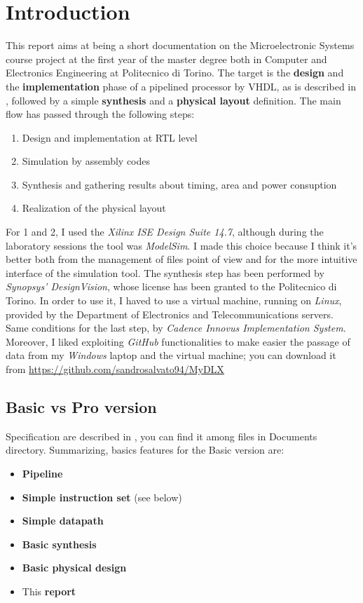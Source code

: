 \chapter{Introduction}

This report aims at being a short documentation on the Microelectronic Systems course project at the first year of the master degree both in Computer and Electronics Engineering at Politecnico di Torino. \newline
The target is the \textbf{design} and the \textbf{implementation} phase of a pipelined processor by VHDL, as is described in \cite{book:rif.1}, followed by a simple \textbf{synthesis} and a \textbf{physical layout} definition. The main flow has passed through the following steps:
\begin{enumerate}
\item Design and implementation at RTL level
\item Simulation by assembly codes
\item Synthesis and gathering results about timing, area and power consuption
\item Realization of the physical layout
\end{enumerate}

For 1 and 2, I used the \textit{Xilinx ISE Design Suite 14.7}, although during the laboratory sessions the tool was \textit{ModelSim}. I made this choice because I think it's better both from the management of files point of view and for the more intuitive interface of the simulation tool. The synthesis step has been performed by \textit{Synopsys' DesignVision}, whose license has been granted to the Politecnico di Torino. In order to use it, I haved to use a virtual machine, running on \textit{Linux}, provided by the Department of Electronics and Telecommunications servers. Same conditions for the last step, by \textit{Cadence Innovus Implementation System}. Moreover, I liked exploiting \textit{GitHub} functionalities to make easier the passage of data from my \textit{Windows} laptop and the virtual machine; you can download it from \url{https://github.com/sandrosalvato94/MyDLX}

\section{Basic vs Pro version}

Specification are described in \cite{ProjectSpecification}, you can find it among files in Documents directory. Summarizing, basics features for the Basic version are:
\begin{itemize}
\item \textbf{Pipeline}
\item \textbf{Simple instruction set} (see below)
\item \textbf{Simple datapath}
\item \textbf{Basic synthesis}
\item \textbf{Basic physical design}
\item This \textbf{report}
\end{itemize}

